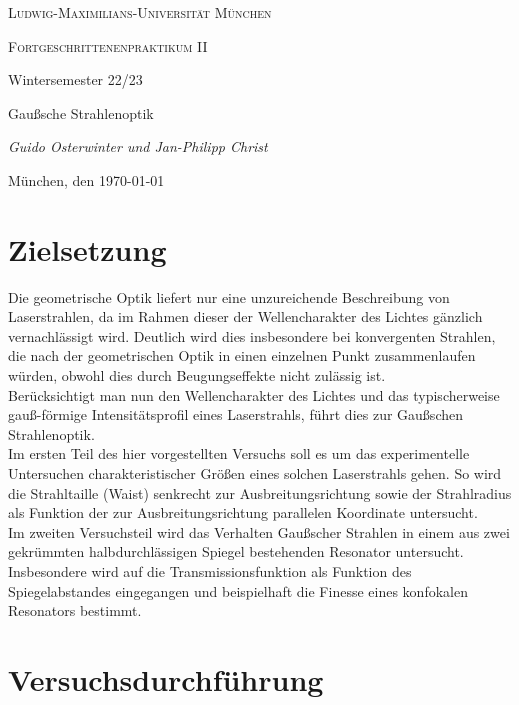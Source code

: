 \documentclass[11pt,a4paper,oneside]{scrartcl}
\begin{document}
\begin{titlepage}
	\centering
	{\scshape\LARGE Ludwig-Maximilians-Universität \linebreak München \par}
	\vspace{1cm}
	{\scshape\Large Fortgeschrittenenpraktikum II \par Wintersemester 22/23 \par}
	\vspace{1.5cm}
	{\huge\bfseries \par  Gaußsche Strahlenoptik\par}
	\vspace{2cm}
	{\Large\itshape Guido Osterwinter und Jan-Philipp Christ \par}
	\vfill
	{\large München, den \today\par}
\end{titlepage}

\tableofcontents
\newpage
\section{Zielsetzung}
Die geometrische Optik liefert nur eine unzureichende Beschreibung von Laserstrahlen, da im Rahmen dieser der Wellencharakter des Lichtes gänzlich vernachlässigt wird. Deutlich wird dies insbesondere bei konvergenten Strahlen, die nach der geometrischen Optik in einen einzelnen Punkt zusammenlaufen würden, obwohl dies durch Beugungseffekte nicht zulässig ist. \\
Berücksichtigt man nun den Wellencharakter des Lichtes und das typischerweise gauß-förmige Intensitätsprofil eines Laserstrahls, führt dies zur Gaußschen Strahlenoptik. \\
Im ersten Teil des hier vorgestellten Versuchs soll es um das experimentelle Untersuchen charakteristischer Größen eines solchen Laserstrahls gehen. So wird die Strahltaille (Waist) senkrecht zur Ausbreitungsrichtung sowie der Strahlradius als Funktion der zur Ausbreitungsrichtung parallelen Koordinate untersucht.\\
Im zweiten Versuchsteil wird das Verhalten Gaußscher Strahlen in einem aus zwei gekrümmten halbdurchlässigen Spiegel bestehenden Resonator untersucht. Insbesondere wird auf die Transmissionsfunktion als Funktion des Spiegelabstandes eingegangen und beispielhaft die Finesse eines konfokalen Resonators bestimmt. 
\section{Versuchsdurchführung}
\end{document}
